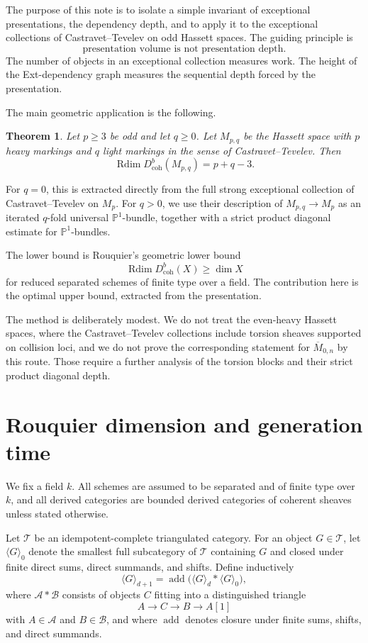 \documentclass[11pt]{amsart}
\numberwithin{equation}{section}
\newtheorem{theorem}{Theorem}[section]
\theoremstyle{definition}
\DeclareMathOperator{\Rdim}{Rdim}
\newcommand{\Db}{D^b_{\mathrm{coh}}}
\begin{document}
The purpose of this note is to isolate a simple invariant of exceptional presentations, the dependency depth, and to apply it to the exceptional collections of Castravet--Tevelev on odd Hassett spaces. The guiding principle is
\[
\text{presentation volume is not presentation depth.}
\]
The number of objects in an exceptional collection measures work. The height of the Ext-dependency graph measures the sequential depth forced by the presentation.

The main geometric application is the following.

\begin{theorem}
Let $p\ge 3$ be odd and let $q\ge0$. Let $M_{p,q}$ be the Hassett space with $p$ heavy markings and $q$ light markings in the sense of Castravet--Tevelev. Then
\[
\Rdim \Db(M_{p,q})=p+q-3.
\]
\end{theorem}

For $q=0$, this is extracted directly from the full strong exceptional collection of Castravet--Tevelev on $M_p$. For $q>0$, we use their description of $M_{p,q}\to M_p$ as an iterated $q$-fold universal $\mathbb P^1$-bundle, together with a strict product diagonal estimate for $\mathbb P^1$-bundles.

The lower bound is Rouquier's geometric lower bound
\[
\Rdim \Db(X)\ge \dim X
\]
for reduced separated schemes of finite type over a field. The contribution here is the optimal upper bound, extracted from the presentation.

The method is deliberately modest. We do not treat the even-heavy Hassett spaces, where the Castravet--Tevelev collections include torsion sheaves supported on collision loci, and we do not prove the corresponding statement for $\overline M_{0,n}$ by this route. Those require a further analysis of the torsion blocks and their strict product diagonal depth.

\section{Rouquier dimension and generation time}

We fix a field $k$. All schemes are assumed to be separated and of finite type over $k$, and all derived categories are bounded derived categories of coherent sheaves unless stated otherwise.

Let $\mathcal T$ be an idempotent-complete triangulated category. For an object $G\in\mathcal T$, let $\langle G\rangle_0$ denote the smallest full subcategory of $\mathcal T$ containing $G$ and closed under finite direct sums, direct summands, and shifts. Define inductively
\[
\langle G\rangle_{d+1}
=
\operatorname{add}\bigl(\langle G\rangle_d * \langle G\rangle_0\bigr),
\]
where $\mathcal A*\mathcal B$ consists of objects $C$ fitting into a distinguished triangle
\[
A\to C\to B\to A[1]
\]
with $A\in\mathcal A$ and $B\in\mathcal B$, and where $\operatorname{add}$ denotes closure under finite sums, shifts, and direct summands.
\end{document}
